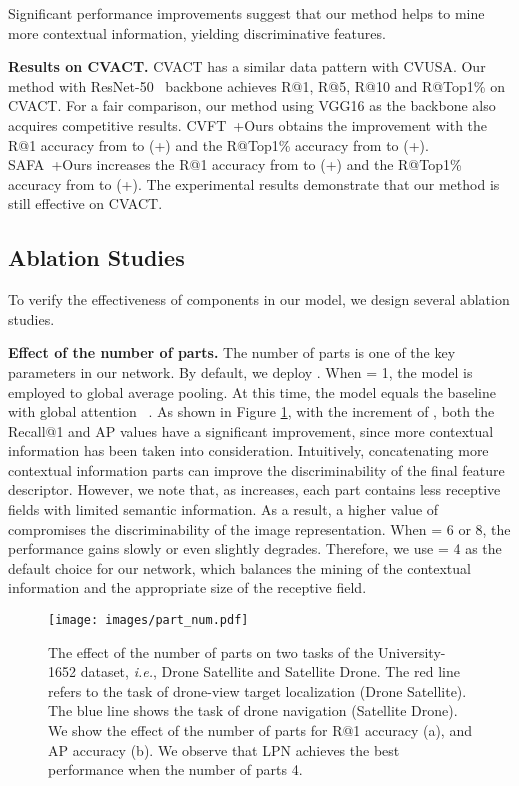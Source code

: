 \documentclass[journal]{IEEEtran}
\def\ie{\emph{i.e.}}
\begin{document}
Significant performance improvements suggest that our method helps to mine more contextual information, yielding discriminative features.
\par
\textbf{Results on CVACT.} CVACT has a similar data pattern with CVUSA. Our method with ResNet-50~\cite{he2016deep} backbone achieves  R@1,  R@5,  R@10 and  R@Top1\% on CVACT. For a fair comparison, our method using VGG16 as the backbone also acquires competitive results. CVFT~\cite{shi_optimal_nodate}+Ours obtains the improvement with the R@1 accuracy from  to  (+) and the R@Top1\% accuracy from  to  (+). SAFA~\cite{shi_spatial-aware_nodate}+Ours increases the R@1 accuracy from  to  (+) and the R@Top1\% accuracy from  to  (+). The experimental results demonstrate that our method is still effective on CVACT.

\subsection{Ablation Studies}\label{ablation}
To verify the effectiveness of components in our model, we design several ablation studies.
\par
\textbf{Effect of the number of parts.} 
The number of parts  is one of the key parameters in our network. By default, we deploy . 
When  = 1, the model is employed to global average pooling. At this time, the model equals the baseline with global attention ~\cite{zheng_university-1652_nodate}.
As shown in Figure \ref{fig:parts}, with the increment of , both the Recall@1 and AP values have a significant improvement, since more contextual information has been taken into consideration. Intuitively, concatenating more contextual information parts can improve the discriminability of the final feature descriptor. However, we note that, as  increases, each part contains less receptive fields with limited semantic information. As a result, a higher value of  compromises the discriminability of the image representation. When  = 6 or 8, the performance gains slowly or even slightly degrades. Therefore, we use  = 4 as the default choice for our network, which balances the mining of the contextual information and the appropriate size of the receptive field. 

\begin{figure}[htbp]
  \centering
  \texttt{[image: images/part\_num.pdf]}
  \caption{The effect of the number of parts  on two tasks of the University-1652 dataset, \ie, Drone  Satellite and Satellite  Drone. The red line refers to the task of drone-view target localization (Drone  Satellite). The blue line shows the task of drone navigation (Satellite  Drone). We show the effect of the number of parts for R@1 accuracy (a), and AP accuracy (b). We observe that LPN achieves the best performance when the number of parts 4.}
  \label{fig:parts}
\end{figure}
\end{document}
